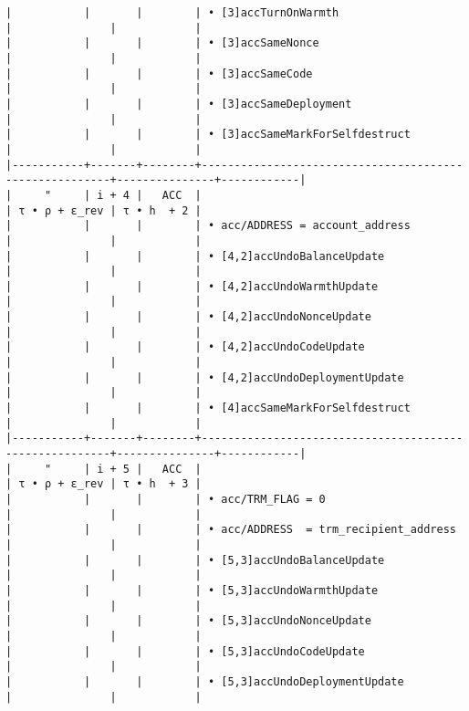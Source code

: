 \documentclass[varwidth=\maxdimen,margin=0.5cm,multi={verbatim}]{standalone}
\begin{document}
\begin{verbatim}
|           |       |        | • [3]accTurnOnWarmth                                   |               |            |
|           |       |        | • [3]accSameNonce                                      |               |            |
|           |       |        | • [3]accSameCode                                       |               |            |
|           |       |        | • [3]accSameDeployment                                 |               |            |
|           |       |        | • [3]accSameMarkForSelfdestruct                        |               |            |
|-----------+-------+--------+--------------------------------------------------------+---------------+------------|
|     "     | i + 4 |   ACC  |                                                        | τ • ρ + ε_rev | τ • h  + 2 |
|           |       |        | • acc/ADDRESS = account_address                        |               |            |
|           |       |        | • [4,2]accUndoBalanceUpdate                            |               |            |
|           |       |        | • [4,2]accUndoWarmthUpdate                             |               |            |
|           |       |        | • [4,2]accUndoNonceUpdate                              |               |            |
|           |       |        | • [4,2]accUndoCodeUpdate                               |               |            |
|           |       |        | • [4,2]accUndoDeploymentUpdate                         |               |            |
|           |       |        | • [4]accSameMarkForSelfdestruct                        |               |            |
|-----------+-------+--------+--------------------------------------------------------+---------------+------------|
|     "     | i + 5 |   ACC  |                                                        | τ • ρ + ε_rev | τ • h  + 3 |
|           |       |        | • acc/TRM_FLAG = 0                                     |               |            |
|           |       |        | • acc/ADDRESS  = trm_recipient_address                 |               |            |
|           |       |        | • [5,3]accUndoBalanceUpdate                            |               |            |
|           |       |        | • [5,3]accUndoWarmthUpdate                             |               |            |
|           |       |        | • [5,3]accUndoNonceUpdate                              |               |            |
|           |       |        | • [5,3]accUndoCodeUpdate                               |               |            |
|           |       |        | • [5,3]accUndoDeploymentUpdate                         |               |            |

\end{verbatim}
\end{document}
